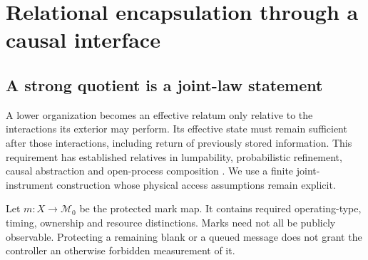 

\section{Relational encapsulation through a causal interface}\label{sec:composition}
\subsection{A strong quotient is a joint-law statement}
A lower organization becomes an effective relatum only relative to the interactions its exterior may perform. Its effective state must remain sufficient after those interactions, including return of previously stored information. This requirement has established relatives in lumpability, probabilistic refinement, causal abstraction and open-process composition \cite{LarsenSkou1991,DorschEtAl2017,RubensteinEtAl2017,BaezCourser2018}. We use a finite joint-instrument construction whose physical access assumptions remain explicit.

Let \(m:X\to\mathcal M_0\) be the protected mark map. It contains required operating-type, timing, ownership and resource distinctions. Marks need not all be publicly observable. Protecting a remaining blank or a queued message does not grant the controller an otherwise forbidden measurement of it.

